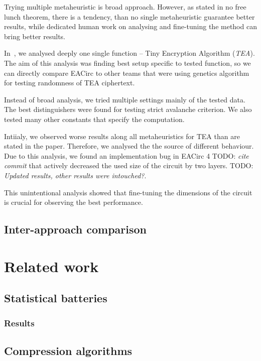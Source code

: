 \documentclass[
  print, %
  Table,   %
  nolof,     %
  nolot,     %
  11pt, %
  oneside  %
]{fithesis3}
\newcommand{\todo}[1]{TODO: \textit{#1}}
\begin{document}
Trying multiple metaheuristic is broad approach. However, as stated in no free lunch theorem, there is a tendency, than no single metaheuristic guarantee better results, while dedicated human work on analysing and fine-tuning the method can bring better results.

In~\cite{kubicek2016new}, we analysed deeply one single function -- Tiny Encryption Algorithm (\textit{TEA}). The aim of this analysis was finding best setup specific to tested function, so we can directly compare EACirc to other teams that were using genetics algorithm for testing randomness of TEA ciphertext.

Instead of broad analysis, we tried multiple settings mainly of the tested data. The best distinguishers were found for testing strict avalanche criterion. We also tested many other constants that specify the computation.

Intiialy, we observed worse results along all metaheuristics for TEA than are stated in the paper. Therefore, we analysed the the source of different behaviour. Due to this analysis, we found an implementation bug in EACirc 4 \todo{cite commit} that actively decreased the used size of the circuit by two layers. \todo{Updated results, other results were intouched?}.

This unintentional analysis showed that fine-tuning the dimensions of the circuit is crucial for observing the best performance.

\section{Inter-approach comparison}
\label{sec:res-comp}


\chapter{Related work}
\label{chap:relatwork}

\section{Statistical batteries}
\label{sec:relatwork-stat}

\subsection{Results}
\label{subsec:relatwork-stat-res}

\section{Compression algorithms}
\label{sec:relatwork-compress}
\end{document}
